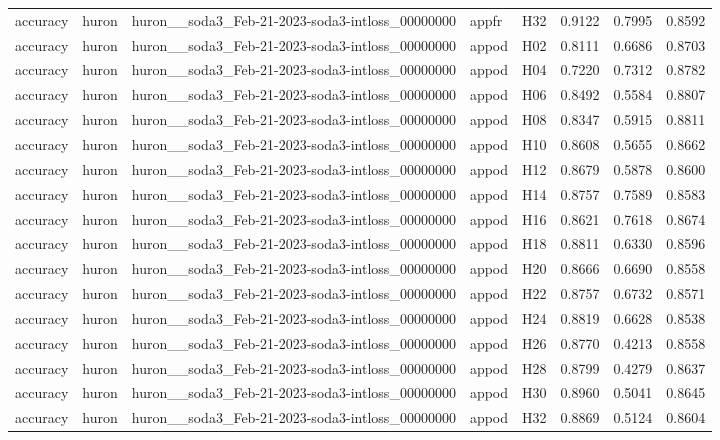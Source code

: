 \begin{table}[tbp]
\begin{tabular}{lllllrrr}
accuracy & huron & huron\_\_soda3\_Feb-21-2023-soda3-intloss\_00000000 & appfr & H32 & 0.9122 & 0.7995 & 0.8592 \\
accuracy & huron & huron\_\_soda3\_Feb-21-2023-soda3-intloss\_00000000 & appod & H02 & 0.8111 & 0.6686 & 0.8703 \\
accuracy & huron & huron\_\_soda3\_Feb-21-2023-soda3-intloss\_00000000 & appod & H04 & 0.7220 & 0.7312 & 0.8782 \\
accuracy & huron & huron\_\_soda3\_Feb-21-2023-soda3-intloss\_00000000 & appod & H06 & 0.8492 & 0.5584 & 0.8807 \\
accuracy & huron & huron\_\_soda3\_Feb-21-2023-soda3-intloss\_00000000 & appod & H08 & 0.8347 & 0.5915 & 0.8811 \\
accuracy & huron & huron\_\_soda3\_Feb-21-2023-soda3-intloss\_00000000 & appod & H10 & 0.8608 & 0.5655 & 0.8662 \\
accuracy & huron & huron\_\_soda3\_Feb-21-2023-soda3-intloss\_00000000 & appod & H12 & 0.8679 & 0.5878 & 0.8600 \\
accuracy & huron & huron\_\_soda3\_Feb-21-2023-soda3-intloss\_00000000 & appod & H14 & 0.8757 & 0.7589 & 0.8583 \\
accuracy & huron & huron\_\_soda3\_Feb-21-2023-soda3-intloss\_00000000 & appod & H16 & 0.8621 & 0.7618 & 0.8674 \\
accuracy & huron & huron\_\_soda3\_Feb-21-2023-soda3-intloss\_00000000 & appod & H18 & 0.8811 & 0.6330 & 0.8596 \\
accuracy & huron & huron\_\_soda3\_Feb-21-2023-soda3-intloss\_00000000 & appod & H20 & 0.8666 & 0.6690 & 0.8558 \\
accuracy & huron & huron\_\_soda3\_Feb-21-2023-soda3-intloss\_00000000 & appod & H22 & 0.8757 & 0.6732 & 0.8571 \\
accuracy & huron & huron\_\_soda3\_Feb-21-2023-soda3-intloss\_00000000 & appod & H24 & 0.8819 & 0.6628 & 0.8538 \\
accuracy & huron & huron\_\_soda3\_Feb-21-2023-soda3-intloss\_00000000 & appod & H26 & 0.8770 & 0.4213 & 0.8558 \\
accuracy & huron & huron\_\_soda3\_Feb-21-2023-soda3-intloss\_00000000 & appod & H28 & 0.8799 & 0.4279 & 0.8637 \\
accuracy & huron & huron\_\_soda3\_Feb-21-2023-soda3-intloss\_00000000 & appod & H30 & 0.8960 & 0.5041 & 0.8645 \\
accuracy & huron & huron\_\_soda3\_Feb-21-2023-soda3-intloss\_00000000 & appod & H32 & 0.8869 & 0.5124 & 0.8604 \\

\end{tabular}
\end{table}
